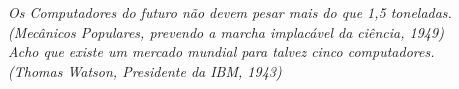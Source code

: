 
\begin{epigrafe}
  \vspace*{\fill}
  \begin{flushright}
    \textit{Os Computadores do futuro não devem pesar mais do que 1,5 toneladas. \\
           (Mecânicos Populares, prevendo a marcha implacável da ciência, 1949) \\[4mm]
           Acho que existe um mercado mundial para talvez cinco computadores. \\
           (Thomas Watson, Presidente da IBM, 1943)}
  \end{flushright}
\end{epigrafe}

\cleardoublepage


